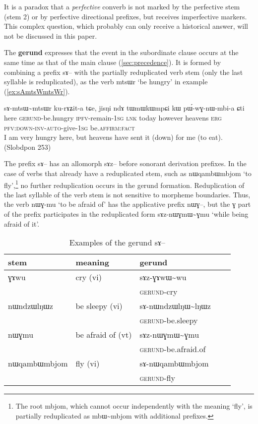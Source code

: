 \documentclass[oldfontcommands,oneside,a4paper,11pt]{article}
\newcommand{\ipa}[1]{{\phon \mbox{#1}}} %
\newcommand{\refb}[1]{(\ref{#1})}
\begin{document}
It is a paradox that a \textit{perfective}  converb is not marked by the perfective stem (stem 2) or by perfective directional prefixes, but receives imperfective markers. This complex question, which probably can only receive a historical answer, will not be discussed in this paper.

The \textbf{gerund}   expresses that the event in the subordinate clause occurs at the same time as that of the main clause \refb{sec:precedence}. It is formed by combining a prefix  \ipa{sɤ}-- with the partially reduplicated verb stem (only the last syllable is reduplicated), as the verb \ipa{mtsɯr} `be hungry' in example \refb{ex:sAmtsWmtsWr}.

\begin{exe}
\ex \label{ex:sAmtsWmtsWr}
\gll  \ipa{kutɕu}  	\ipa{sɤ-mtsɯ\textasciitilde{}mtsɯr}  	\ipa{ku-rɤʑit-a}  	\ipa{tɕe,}  	\ipa{jisŋi}  	\ipa{ndɤ}  	\ipa{tɯmɯkɯmpɕi}  	\ipa{kɯ}  	\ipa{pɯ́-wɣ-nɯ-mbi-a}  	\ipa{ɕti}  \\
 here \textsc{gerund}-be.hungry \textsc{ipfv}-remain-\textsc{1sg} \textsc{lnk} today however heavens \textsc{erg} \textsc{pfv:down-inv-auto}-give-\textsc{1sg} be.\textsc{affirm}:\textsc{fact} \\
\glt I am very hungry here, but heavens have sent it (down) for  me (to eat). (Slobdpon 253)
\end{exe}

The prefix \ipa{sɤ}-- has an allomorph \ipa{sɤz}-- before sonorant derivation prefixes.  In the case of verbs that already have a reduplicated stem, such as \ipa{nɯqambɯmbjom} `to fly',\footnote{The root \ipa{mbjom}, which cannot occur independently with the meaning `fly', is partially reduplicated as \ipa{mbɯ\textasciitilde{}mbjom} with additional prefixes.} no further reduplication occurs in the gerund formation. Reduplication of the last syllable of the verb stem is not sensitive to morpheme boundaries. Thus, the verb \ipa{nɯɣ-mu} `to be afraid of' has the applicative prefix \ipa{nɯɣ}--, but the \ipa{ɣ} part of the prefix participates in the reduplicated form \ipa{sɤz-nɯɣmɯ\textasciitilde{}ɣmu} `while being afraid of it'.

\begin{table}[h]
\caption{Examples of the gerund \ipa{sɤ}--} \label{tab:gerund} \centering
\begin{tabular}{lllll}
\toprule
stem & meaning & gerund \\
\midrule
\ipa{ɣɤwu}& cry (vi)& \ipa{sɤz-ɣɤwɯ\textasciitilde{}wu}\\
&&\textsc{gerund}-cry \\
\ipa{nɯndzɯlŋɯz}& be sleepy (vi)& \ipa{sɤ-nɯndzɯlŋɯ\textasciitilde{}lŋɯz}\\
&&\textsc{gerund}-be.sleepy \\
\ipa{nɯɣmu}& be afraid of (vt)& \ipa{sɤz-nɯɣmɯ\textasciitilde{}ɣmu}\\
&&\textsc{gerund}-be.afraid.of \\
\midrule
\ipa{nɯqambɯmbjom} & fly (vi) &\ipa{sɤ-nɯqambɯmbjom} \\
&&\textsc{gerund}-fly \\
\bottomrule
\end{tabular}
\end{table}
\end{document}
